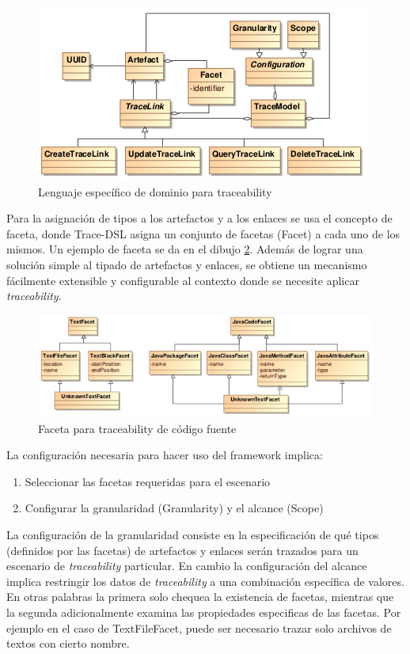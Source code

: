 \documentclass[a4paper,12pt,oneside,spanish]{book}
\begin{document}
\begin{figure}[hbtp]
\centering
\includegraphics[scale=.8]{./img/Trace-DSL}
\caption{Lenguaje específico de dominio para traceability}
\label{fig:DSLTrace}
\end{figure}

Para la asignación de tipos a los artefactos y a los enlaces se usa el concepto de faceta, donde Trace-DSL asigna un conjunto de facetas (Facet) a cada uno de los mismos. Un ejemplo de faceta se da en el dibujo \ref{fig:FacetaCodigoFuente}. Además de lograr una solución simple al tipado de artefactos y enlaces, se obtiene un mecanismo fácilmente extensible y configurable al contexto donde se necesite aplicar \textit{traceability}.

\begin{figure}[hbtp]
\centering
\includegraphics[scale=.72]{./img/Faceta}
\caption{Faceta para traceability de código fuente}
\label{fig:FacetaCodigoFuente}
\end{figure}

La configuración necesaria para hacer uso del framework implica:

\begin{enumerate}
\item Seleccionar las facetas requeridas para el escenario
\item Configurar la granularidad (Granularity) y el alcance (Scope)
\end{enumerate}

La configuración de la granularidad consiste en la especificación de qué tipos (definidos por las facetas) de artefactos y enlaces serán trazados para un escenario de \textit{traceability} particular. En cambio la configuración del alcance implica restringir los datos de \textit{traceability} a una combinación específica de valores. En otras palabras la primera solo chequea la existencia de facetas, mientras que la segunda adicionalmente examina las propiedades especificas de las facetas. Por ejemplo en el caso de TextFileFacet, puede ser necesario trazar solo archivos de textos con cierto nombre.
\end{document}
